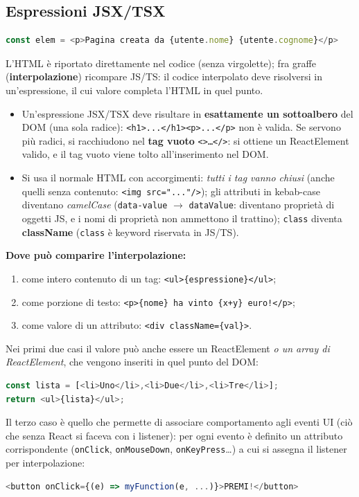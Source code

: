 \subsection{Espressioni JSX/TSX}
\begin{lstlisting}[language=JavaScript]
const elem = <p>Pagina creata da {utente.nome} {utente.cognome}</p>
\end{lstlisting}
L'HTML \`e riportato direttamente nel codice (senza virgolette); fra graffe
(\textbf{interpolazione}) ricompare JS/TS: il codice interpolato deve risolversi in
un'espressione, il cui valore completa l'HTML in quel punto.
\begin{itemize}
  \item Un'espressione JSX/TSX deve risultare in \textbf{esattamente un sottoalbero} del DOM
        (una sola radice): \texttt{<h1>...</h1><p>...</p>} non \`e valida. Se servono
        pi\`u radici, si racchiudono nel \textbf{tag vuoto} \texttt{<>\dots</>}: si ottiene
        un ReactElement valido, e il tag vuoto viene tolto all'inserimento nel DOM.
  \item Si usa il normale HTML con accorgimenti: \emph{tutti i tag vanno chiusi} (anche
        quelli senza contenuto: \texttt{<img src="..."/>}); gli attributi in kebab-case
        diventano \emph{camelCase} (\texttt{data-value} $\rightarrow$ \texttt{dataValue}:
        diventano propriet\`a di oggetti JS, e i nomi di propriet\`a non ammettono il
        trattino); \texttt{class} diventa \textbf{className} (\texttt{class} \`e keyword
        riservata in JS/TS).
\end{itemize}

\textbf{Dove pu\`o comparire l'interpolazione:}
\begin{enumerate}
  \item come intero contenuto di un tag: \texttt{<ul>\{espressione\}</ul>};
  \item come porzione di testo: \texttt{<p>\{nome\} ha vinto \{x+y\} euro!</p>};
  \item come valore di un attributo: \texttt{<div className=\{val\}>}.
\end{enumerate}
Nei primi due casi il valore pu\`o anche essere un ReactElement \emph{o un array di
ReactElement}, che vengono inseriti in quel punto del DOM:
\begin{lstlisting}[language=JavaScript]
const lista = [<li>Uno</li>,<li>Due</li>,<li>Tre</li>];
return <ul>{lista}</ul>;
\end{lstlisting}
Il terzo caso \`e quello che permette di associare comportamento agli eventi UI (ci\`o che
senza React si faceva con i listener): per ogni evento \`e definito un attributo
corrispondente (\texttt{onClick}, \texttt{onMouseDown}, \texttt{onKeyPress}\dots) a cui si
assegna il listener per interpolazione:
\begin{lstlisting}[language=JavaScript]
<button onClick={(e) => myFunction(e, ...)}>PREMI!</button>
\end{lstlisting}

